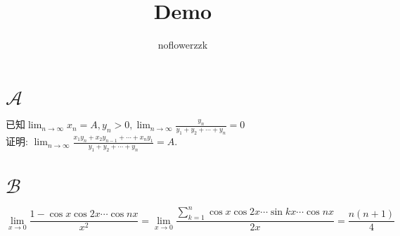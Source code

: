 \documentclass{article}
\title{Demo}
\author{noflowerzzk}
\date{}
\begin{document}
\maketitle

\section{$\mathcal{A} $}
已知$\displaystyle{\lim_{n \to \infty}x_n = A , y_n > 0, \lim_{n \to \infty}\frac{y_n}{y_1 + y_2 + \cdots + y_n} = 0}$ \\
证明: $\displaystyle{\lim_{n \to \infty}\frac{x_1 y_n + x_2 y_{n - 1} + \cdots + x_n y_1}{y_1 + y_2 + \cdots + y_n} = A}$.

\section{$\mathcal{B} $}
\[
\lim_{x \to 0}\frac{1 - \cos x \cos 2x \cdots \cos nx}{x^2}
= \lim_{x \to 0}\frac{\displaystyle{\sum_{k = 1}^{n}\cos x \cos 2x \cdots \sin kx \cdots \cos nx}}{2x}
= \frac{n(n + 1)}{4}
\]
\end{document}
